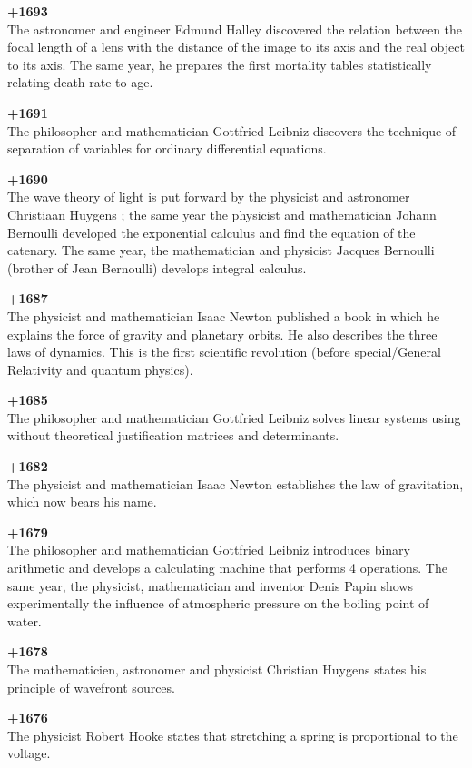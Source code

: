 \textbf{+1693}\\
The astronomer and engineer Edmund Halley discovered the relation between the focal length of a lens with the distance of the image to its axis and the real object to its axis. The same year, he prepares the first mortality tables statistically relating death rate to age.

\pagebreak
\textbf{+1691}\\
The philosopher and mathematician Gottfried Leibniz discovers the technique of separation of variables for ordinary differential equations.

\textbf{+1690}\\
The wave theory of light is put forward by the physicist and astronomer Christiaan Huygens ; the same year the physicist and mathematician Johann Bernoulli developed the exponential calculus and find the equation of the catenary. The same year, the mathematician and physicist Jacques Bernoulli (brother of Jean Bernoulli) develops integral calculus.

\textbf{+1687}\\
The physicist and mathematician Isaac Newton published a book in which he explains the force of gravity and planetary orbits. He also describes the three laws of dynamics. This is the first scientific revolution (before special/General Relativity and quantum physics).

\textbf{+1685}\\
The philosopher and mathematician Gottfried Leibniz solves linear systems using without theoretical justification matrices and determinants.

\textbf{+1682}\\
The physicist and mathematician Isaac Newton establishes the law of gravitation, which now bears his name.

\textbf{+1679}\\
The philosopher and mathematician Gottfried Leibniz introduces binary arithmetic and develops a calculating machine that performs 4 operations. The same year, the physicist, mathematician and inventor Denis Papin shows experimentally the influence of atmospheric pressure on the boiling point of water.

\textbf{+1678}\\
The mathematicien, astronomer and physicist Christian Huygens states his principle of wavefront sources.

\textbf{+1676}\\
The physicist Robert Hooke states that stretching a spring is proportional to the voltage.

